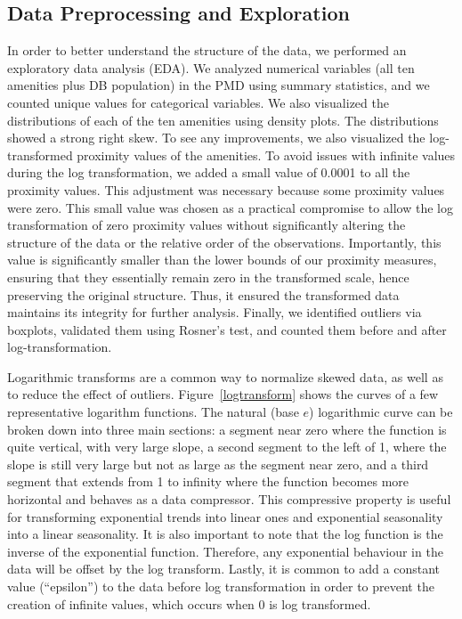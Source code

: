 \documentclass[11pt, a4paper]{article}
\begin{document}
\subsection{Data Preprocessing and Exploration}


In order to better understand the structure of the data, we performed an exploratory data analysis (EDA). We analyzed numerical variables (all ten amenities plus DB population) in the PMD using summary statistics, and we counted unique values for categorical variables. We also visualized the distributions of each of the ten amenities using density plots. The distributions showed a strong right skew. To see any improvements, we also visualized the log-transformed proximity values of the amenities. To avoid issues with infinite values during the log transformation, we added a small value of 0.0001 to all the proximity values. This adjustment was necessary because some proximity values were zero. This small value was chosen as a practical compromise to allow the log transformation of zero proximity values without significantly altering the structure of the data or the relative order of the observations. Importantly, this value is significantly smaller than the lower bounds of our proximity measures, ensuring that they essentially remain zero in the transformed scale, hence preserving the original structure. Thus, it ensured the transformed data maintains its integrity for further analysis.  Finally, we identified outliers via boxplots, validated them using Rosner’s test, and counted them before and after log-transformation.
\par
Logarithmic transforms are a common way to normalize skewed data, as well as to reduce the effect of outliers. Figure~\ref{logtransform} shows the curves of a few representative logarithm functions. The natural (base $e$) logarithmic curve can be broken down into three main sections: a segment near zero where the function is quite vertical, with very large slope, a second segment to the left of 1, where the slope is still very large but not as large as the segment near zero, and a third segment that extends from 1 to infinity where the function becomes more horizontal and behaves as a data compressor. This compressive property is useful for transforming exponential trends into linear ones and exponential seasonality into a linear seasonality. It is also important to note that the log function is the inverse of the exponential function. Therefore, any exponential behaviour in the data will be offset by the log transform. Lastly, it is common to add a constant value (``epsilon'') to the data before log transformation in order to prevent the creation of infinite values, which occurs when 0 is log transformed.
\end{document}
